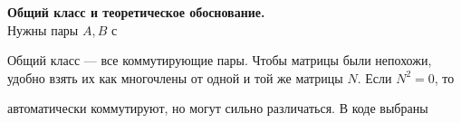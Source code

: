 \documentclass[a4paper,14pt]{extarticle}
\begin{document}
\textbf{Общий класс и теоретическое обоснование.}\\
Нужны пары \(A,B\) с \begin{center}\end{center} Общий класс --- все коммутирующие пары. Чтобы матрицы были непохожи,
удобно взять их как многочлены от одной и той же матрицы \(N\). Если
\(N^2=0\), то \begin{center}\end{center} автоматически коммутируют, но могут сильно различаться. В коде
выбраны \begin{center}\end{center} \begin{center}\end{center}
\end{document}
